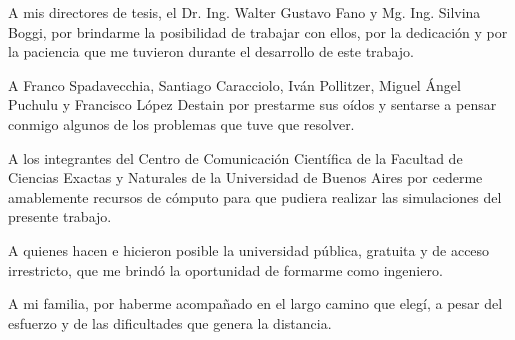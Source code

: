 A mis directores de tesis, el Dr. Ing. Walter Gustavo Fano y Mg. Ing. Silvina Boggi, por brindarme la posibilidad de trabajar con ellos, por la dedicación y por la paciencia que me tuvieron durante el desarrollo de este trabajo.

A Franco Spadavecchia, Santiago Caracciolo, Iván Pollitzer, Miguel Ángel Puchulu y Francisco López Destain por prestarme sus oídos y sentarse a pensar conmigo algunos de los problemas que tuve que resolver.

A los integrantes del Centro de Comunicación Científica de la Facultad de Ciencias Exactas y Naturales de la Universidad de Buenos Aires por cederme amablemente recursos de cómputo para que pudiera realizar las simulaciones del presente trabajo.

A quienes hacen e hicieron posible la universidad pública, gratuita y de acceso irrestricto, que me brindó la oportunidad de formarme como ingeniero.

A mi familia, por haberme acompañado en el largo camino que elegí, a pesar del esfuerzo y de las dificultades que genera la distancia.